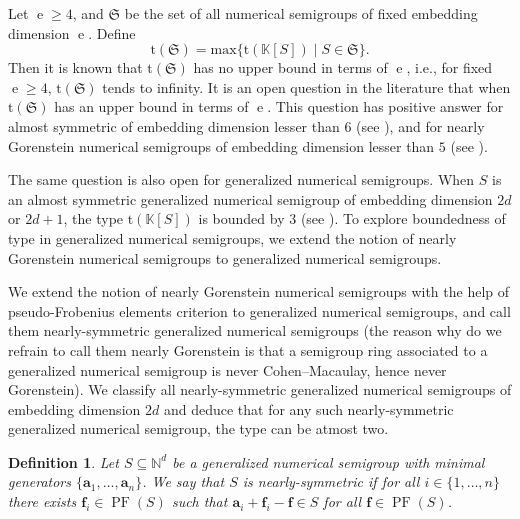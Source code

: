 \documentclass[12pt]{amsart}
\theoremstyle{plain}
\theoremstyle{theorem}
\newtheorem{definition}{Definition}[section]
\theoremstyle{remark}
\begin{document}
\medskip
Let $\operatorname{e} \geq 4$, and $\mathfrak{S}$ be the set of all numerical semigroups of fixed embedding dimension $\operatorname{e}$. Define
$$\mathrm{t}(\mathfrak{S}) = \mathrm{max}\{\mathrm{t}(\mathbb{K}[S]) \mid S \in \mathfrak{S}\}.$$
Then it is known that $\mathrm{t}(\mathfrak{S})$ has no upper bound in terms of $\operatorname{e}$, i.e., for fixed $\operatorname{e} \geq 4$, $\mathrm{t}(\mathfrak{S})$ tends to infinity. It is an open question in the literature that when $\mathrm{t}(\mathfrak{S})$ has an upper bound in terms of $\operatorname{e}$. This question has positive answer for almost symmetric of embedding dimension lesser than $6$ (see \cite{Moscariello16, Moscariello23}), and for nearly Gorenstein numerical semigroups of embedding dimension lesser than $5$ (see \cite{Moscaeiello-Strazzanti2021}).

\medskip
The same question is also open for generalized numerical semigroups. When $S$ is an almost symmetric generalized numerical semigroup of embedding dimension $2d$ or $2d+1$, the type $\mathrm{t}(\mathbb{K}[S])$ is bounded by $3$ (see \cite{Bhardwaj-Cisto2025}). To explore boundedness of type in generalized numerical semigroups, we extend the notion of nearly Gorenstein numerical semigroups to generalized numerical semigroups.

\medskip
We extend the notion of nearly Gorenstein numerical semigroups with the help of pseudo-Frobenius elements criterion to generalized numerical semigroups, and call them nearly-symmetric generalized numerical semigroups (the reason why do we refrain to call them nearly Gorenstein is that a semigroup ring associated to a generalized numerical semigroup is never Cohen--Macaulay, hence never Gorenstein). We classify all nearly-symmetric generalized numerical semigroups of embedding dimension $2d$ and deduce that for any such nearly-symmetric generalized numerical semigroup, the type can be atmost two.

\begin{definition} \rm
	Let $S\subseteq \mathbb{N}^d$ be a generalized numerical semigroup with minimal generators $\{\mathbf{a}_1,\ldots,\mathbf{a}_n\}$. We say that $S$ is \emph{nearly-symmetric} if for all $i\in\{1,\ldots,n\}$ there exists $\mathbf{f}_i\in \operatorname{PF}(S)$ such that $\mathbf{a}_i+\mathbf{f}_i-\mathbf{f}\in S$ for all $\mathbf{f}\in \operatorname{PF}(S)$. 
\end{definition} 
\end{document}
